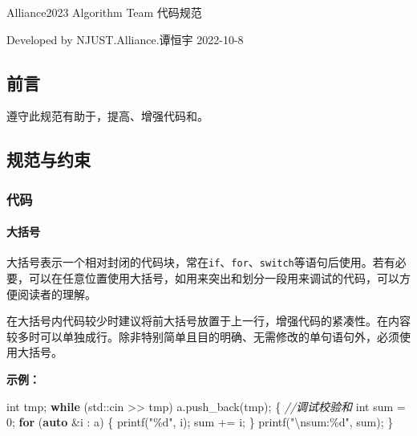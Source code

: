 \documentclass[
]{article}
\author{}
\date{}
\newenvironment{Shaded}{}{}
\newcommand{\BuiltInTok}[1]{\textcolor[rgb]{0.00,0.50,0.00}{#1}}
\newcommand{\CommentTok}[1]{\textcolor[rgb]{0.38,0.63,0.69}{\textit{#1}}}
\newcommand{\ControlFlowTok}[1]{\textcolor[rgb]{0.00,0.44,0.13}{\textbf{#1}}}
\newcommand{\DataTypeTok}[1]{\textcolor[rgb]{0.56,0.13,0.00}{#1}}
\newcommand{\DecValTok}[1]{\textcolor[rgb]{0.25,0.63,0.44}{#1}}
\newcommand{\KeywordTok}[1]{\textcolor[rgb]{0.00,0.44,0.13}{\textbf{#1}}}
\newcommand{\NormalTok}[1]{#1}
\newcommand{\OperatorTok}[1]{\textcolor[rgb]{0.40,0.40,0.40}{#1}}
\newcommand{\SpecialCharTok}[1]{\textcolor[rgb]{0.25,0.44,0.63}{#1}}
\newcommand{\StringTok}[1]{\textcolor[rgb]{0.25,0.44,0.63}{#1}}
\begin{document}
Alliance2023 Algorithm Team 代码规范

Developed by NJUST.Alliance.谭恒宇 2022-10-8

\hypertarget{ux524dux8a00}{%
\subsection{前言}\label{ux524dux8a00}}

遵守此规范有助于，提高、增强代码和。

\hypertarget{ux89c4ux8303ux4e0eux7ea6ux675f}{%
\subsection{规范与约束}\label{ux89c4ux8303ux4e0eux7ea6ux675f}}

\hypertarget{ux4ee3ux7801}{%
\subsubsection{代码}\label{ux4ee3ux7801}}

\hypertarget{ux5927ux62ecux53f7}{%
\paragraph{大括号}\label{ux5927ux62ecux53f7}}

大括号表示一个相对封闭的代码块，常在\texttt{if}、\texttt{for}、\texttt{switch}等语句后使用。若有必要，可以在任意位置使用大括号，如用来突出和划分一段用来调试的代码，可以方便阅读者的理解。

在大括号内代码较少时建议将前大括号放置于上一行，增强代码的紧凑性。在内容较多时可以单独成行。除非特别简单且目的明确、无需修改的单句语句外，必须使用大括号。

\textbf{示例：}

\begin{Shaded}
\begin{Highlighting}[]
\DataTypeTok{int}\NormalTok{ tmp}\OperatorTok{;}
\ControlFlowTok{while} \OperatorTok{(}\BuiltInTok{std::}\NormalTok{cin}\OperatorTok{ \textgreater{}\textgreater{}}\NormalTok{ tmp}\OperatorTok{)}
\NormalTok{	a}\OperatorTok{.}\NormalTok{push\_back}\OperatorTok{(}\NormalTok{tmp}\OperatorTok{);}
\OperatorTok{\{} \CommentTok{//调试校验和}
	\DataTypeTok{int}\NormalTok{ sum }\OperatorTok{=} \DecValTok{0}\OperatorTok{;}
	\ControlFlowTok{for} \OperatorTok{(}\KeywordTok{auto} \OperatorTok{\&}\NormalTok{i }\OperatorTok{:}\NormalTok{ a}\OperatorTok{)} \OperatorTok{\{}
\NormalTok{		printf}\OperatorTok{(}\StringTok{"}\SpecialCharTok{\%d}\StringTok{"}\OperatorTok{,}\NormalTok{ i}\OperatorTok{);}
\NormalTok{		sum }\OperatorTok{+=}\NormalTok{ i}\OperatorTok{;}
	\OperatorTok{\}}
\NormalTok{	printf}\OperatorTok{(}\StringTok{"}\SpecialCharTok{\textbackslash{}n}\StringTok{sum:}\SpecialCharTok{\%d}\StringTok{"}\OperatorTok{,}\NormalTok{ sum}\OperatorTok{);}
\OperatorTok{\}}
\end{Highlighting}
\end{Shaded}
\end{document}
